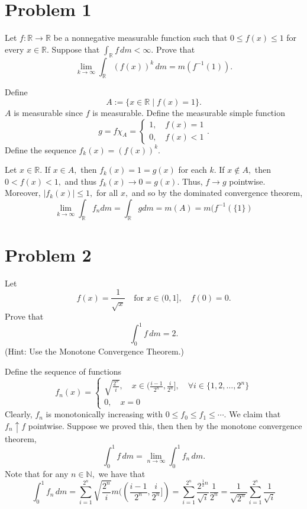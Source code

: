 \documentclass[11pt]{article}
\newcommand{\bbN}{\mathbb{N}}
\newcommand{\bbR}{\mathbb{R}}
\begin{document}
	
	
	\psetheader

\section*{Problem 1}
Let \( f: \mathbb{R} \to \mathbb{R} \) be a nonnegative measurable function such that \( 0 \leq f(x) \leq 1 \) for every \( x \in \mathbb{R} \). Suppose that 
$
\int_{\mathbb{R}} f \, dm < \infty.$
Prove that 
\[
\lim_{k \to \infty} \int_{\mathbb{R}} (f(x))^k \, dm = m(f^{-1}(1)).
\]
\begin{solution}
    Define 
    \[A:= \{x \in \bbR \mid f(x) = 1\}.\] $A$ is measurable since $f$ is measurable. Define the measurable simple function
    \[g = f\chi_A = \begin{cases}
        1, \quad f(x) = 1\\
        0, \quad f(x) <1
    \end{cases}.\] 
    Define the sequence $f_k(x) = (f(x))^k.$
    
    Let $x\in \bbR.$ If $x\in A,$ then $f_k(x) = 1 = g(x)$ for each $k.$ If $x\notin A,$ then $0<f(x)<1,$ and thus $f_k(x) \to 0 = g(x).$ Thus, $f \to g$ pointwise. Moreover, $|f_k(x)| \leq 1,$ for all $x,$ and so by the dominated convergence theorem, 
    \[\lim_{k\to \infty}\int_\bbR f_n dm = \int_\bbR g dm = m(A) = m(f^{-1}(\{1\})\]
\end{solution}


\newpage
\section*{Problem 2}
Let 
\[
f(x) = \frac{1}{\sqrt{x}} \quad \text{for } x \in (0,1], \quad f(0) = 0.
\]
Prove that 
\[
\int_{0}^{1} f \, dm = 2.
\]
(Hint: Use the Monotone Convergence Theorem.)
\begin{solution}
    Define the sequence of functions
    \[f_n(x) = \begin{cases}
        \sqrt{\frac{2^n}{i}}, \quad x\in (\frac{i-1}{2^n}, \frac{i}{2^n}], \quad \forall i\in \{1,2,\dots, 2^n\}\\
        0, \quad x = 0
        \end{cases}\]
Clearly, $f_n$ is monotonically increasing with $0\leq f_0 \leq f_1 \leq\cdots.$ We claim that $f_n \uparrow f$ pointwise. Suppose we proved this, then then by the monotone convergence theorem, 
\[\int_0^1 f \,dm = \lim_{n\to \infty}\int_0^1 f_n \,dm .\] Note that for any $n \in \bbN,$ we have that 
\[\int_0^1 f_n \, dm = \sum_{i=1}^{2^n} \sqrt{\frac{2^n}{i}}m((\frac{i-1}{2^n}, \frac{i}{2^n}]) = \sum_{i=1}^{2^n} \frac{2^{\frac{1}{2}n}}{\sqrt{i}}\frac{1}{2^n} = \frac{1}{\sqrt{2^n}}\sum_{i=1}^{2^n}\frac{1}{\sqrt{i}}\]
\end{solution}
\end{document}
